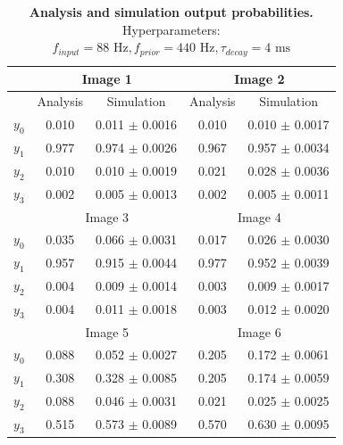 \begin{table}[]
\centering
\label{tab:1D_88_440_4}
\small
\tabcolsep=0.11cm
\begin{tabular}{|c|cc|cc|}
\hline
                       & \multicolumn{2}{c|}{Image 1}                       & \multicolumn{2}{c|}{Image 2}                       \\ \hline
                       & \multicolumn{1}{c|}{Analysis} & Simulation         & \multicolumn{1}{c|}{Analysis} & Simulation         \\ \hline
$y_0$                  & \multicolumn{1}{c|}{0.010}    & 0.011 $\pm$ 0.0016 & \multicolumn{1}{c|}{0.010}    & 0.010 $\pm$ 0.0017 \\ \hline
$y_1$                  & \multicolumn{1}{c|}{0.977}    & 0.974 $\pm$ 0.0026 & \multicolumn{1}{c|}{0.967}    & 0.957 $\pm$ 0.0034 \\ \hline
$y_2$                  & \multicolumn{1}{c|}{0.010}    & 0.010 $\pm$ 0.0019 & \multicolumn{1}{c|}{0.021}    & 0.028 $\pm$ 0.0036 \\ \hline
$y_3$                  & \multicolumn{1}{c|}{0.002}    & 0.005 $\pm$ 0.0013 & \multicolumn{1}{c|}{0.002}    & 0.005 $\pm$ 0.0011 \\ \hline
                       & \multicolumn{2}{c|}{Image 3}                       & \multicolumn{2}{c|}{Image 4}                       \\ \hline
$y_0$                  & \multicolumn{1}{c|}{0.035}    & 0.066 $\pm$ 0.0031 & \multicolumn{1}{c|}{0.017}    & 0.026 $\pm$ 0.0030 \\ \hline
$y_1$                  & \multicolumn{1}{c|}{0.957}    & 0.915 $\pm$ 0.0044 & \multicolumn{1}{c|}{0.977}    & 0.952 $\pm$ 0.0039 \\ \hline
$y_2$                  & \multicolumn{1}{c|}{0.004}    & 0.009 $\pm$ 0.0014 & \multicolumn{1}{c|}{0.003}    & 0.009 $\pm$ 0.0017 \\ \hline
$y_3$                  & \multicolumn{1}{c|}{0.004}    & 0.011 $\pm$ 0.0018 & \multicolumn{1}{c|}{0.003}    & 0.012 $\pm$ 0.0020 \\ \hline
						& \multicolumn{2}{c|}{Image 5}                       & \multicolumn{2}{c|}{Image 6}                       \\ \hline
$y_0$                  & \multicolumn{1}{c|}{0.088}    & 0.052 $\pm$ 0.0027 & \multicolumn{1}{c|}{0.205}    & 0.172 $\pm$ 0.0061 \\ \hline
$y_1$                  & \multicolumn{1}{c|}{0.308}    & 0.328 $\pm$ 0.0085 & \multicolumn{1}{c|}{0.205}    & 0.174 $\pm$ 0.0059 \\ \hline
$y_2$                  & \multicolumn{1}{c|}{0.088}    & 0.046 $\pm$ 0.0031 & \multicolumn{1}{c|}{0.021}    & 0.025 $\pm$ 0.0025 \\ \hline
$y_3$                  & \multicolumn{1}{c|}{0.515}    & 0.573 $\pm$ 0.0089 & \multicolumn{1}{c|}{0.570}    & 0.630 $\pm$ 0.0095 \\ \hline
\end{tabular}
\caption{\textbf{Analysis and simulation output probabilities. } Hyperparameters: $f_{input} = 88\text{ Hz}, f_{prior} = 440\text{ Hz}, \tau_{decay} = 4\text{ ms}$}
\end{table}


